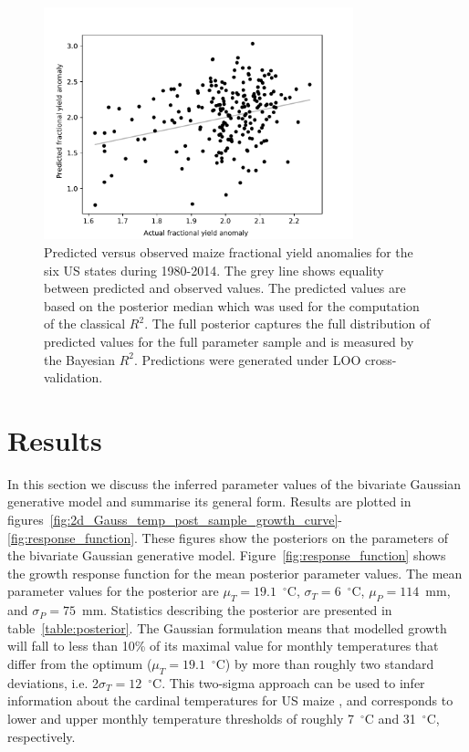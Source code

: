\documentclass[12pt]{article}
\begin{document}
\begin{figure}
\centering
\includegraphics[width=0.8\textwidth]{./figures/loo_all_states_us_maize_frac_anom}
\caption{\label{fig:cv_plot} Predicted versus observed maize fractional yield anomalies for the six US states during 1980-2014. The grey line shows equality between predicted and observed values. The predicted values are based on the posterior median which was used for the computation of the classical $R^2$. The full posterior captures the full distribution of predicted values for the full parameter sample and is measured by the Bayesian $R^2$. Predictions were generated under LOO cross-validation.}
\end{figure}

\section{Results}
\label{sec:results}
In this section we discuss the inferred parameter values of the bivariate Gaussian generative model and summarise its general form. Results are plotted in figures~\ref{fig:2d_Gauss_temp_post_sample_growth_curve}-\ref{fig:response_function}. These figures show the posteriors on the parameters of the bivariate Gaussian generative model. Figure~\ref{fig:response_function} shows the growth response function for the mean posterior parameter values. The mean parameter values for the posterior are $\mu_T = 19.1$~$^\circ$C, $\sigma_T = 6$~$^\circ$C, $\mu_P = 114$~mm, and $\sigma_P = 75$~mm. Statistics describing the posterior are presented in table~\ref{table:posterior}. The Gaussian formulation means that modelled growth will fall to less than 10\% of its maximal value for monthly temperatures that differ from the optimum ($\mu_T = 19.1$~$^\circ$C) by more than roughly two standard deviations, i.e. 2$\sigma_T = 12$~$^\circ$C. This two-sigma approach can be used to infer information about the cardinal temperatures for US maize \citep[e.g.][]{yin:1995}, and corresponds to lower and upper monthly temperature thresholds of roughly 7~$^\circ$C and 31~$^\circ$C, respectively.
\end{document}
